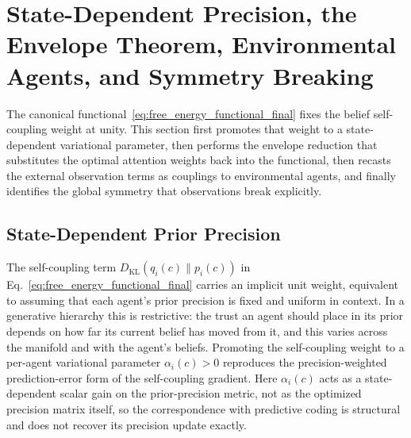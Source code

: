 \section{State-Dependent Precision, the Envelope Theorem, Environmental Agents, and Symmetry Breaking}\label{sec:precision_envelope}

The canonical functional~\eqref{eq:free_energy_functional_final} fixes the belief self-coupling weight at unity. This section first promotes that weight to a state-dependent variational parameter, then performs the envelope reduction that substitutes the optimal attention weights back into the functional, then recasts the external observation terms as couplings to environmental agents, and finally identifies the global symmetry that observations break explicitly.

\subsection{State-Dependent Prior Precision}
\label{sec:state_dependent_precision}

The self-coupling term $D_{\mathrm{KL}}(q_i(c)\|p_i(c))$ in Eq.~\eqref{eq:free_energy_functional_final} carries an implicit unit weight, equivalent to assuming that each agent's prior precision is fixed and uniform in context. In a generative hierarchy this is restrictive: the trust an agent should place in its prior depends on how far its current belief has moved from it, and this varies across the manifold and with the agent's beliefs. Promoting the self-coupling weight to a per-agent variational parameter $\alpha_i(c) > 0$ reproduces the precision-weighted prediction-error form of the self-coupling gradient. Here $\alpha_i(c)$ acts as a state-dependent scalar gain on the prior-precision metric, not as the optimized precision matrix itself, so the correspondence with predictive coding is structural and does not recover its precision update exactly.

